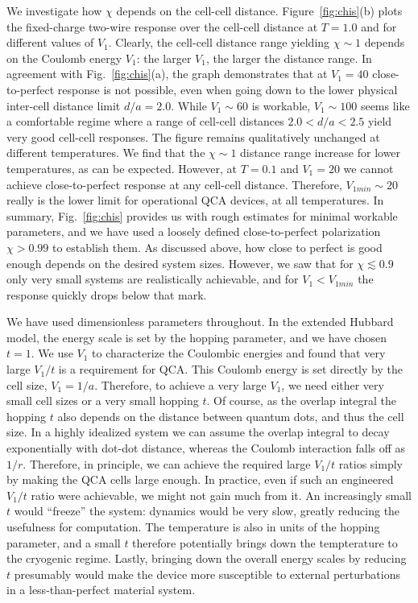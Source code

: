 We investigate how $\chi$ depends on the cell-cell distance.
Figure~\ref{fig:chis}(b) plots the fixed-charge two-wire response over the
cell-cell distance at $T = 1.0$ and for different values of $V_1$. Clearly, the
cell-cell distance range yielding $\chi \sim 1$ depends on the Coulomb energy
$V_1$: the larger $V_1$, the larger the distance range. In agreement with
Fig.~\ref{fig:chis}(a), the graph demonstrates that at $V_1 = 40$
close-to-perfect response is not possible, even when going down to the lower
physical inter-cell distance limit $d/a = 2.0$. While $V_1 \sim 60$ is workable,
$V_1 \sim 100$ seems like a comfortable regime where a range of cell-cell
distances $2.0 < d/a <2.5$ yield very good cell-cell responses. The figure
remains qualitatively unchanged at different temperatures. We find that the
$\chi \sim 1$ distance range increase for lower temperatures, as can be
expected. However, at $T = 0.1$ and $V_1 = 20$ we cannot achieve
close-to-perfect response at any cell-cell distance.  Therefore, $V_{1min} \sim
20$ really is the lower limit for operational QCA devices, at all temperatures.
In summary, Fig.~\ref{fig:chis} provides us with rough estimates for minimal
workable parameters, and we have used a loosely defined close-to-perfect
polarization $\chi > 0.99$ to establish them. As discussed above, how close to
perfect is good enough depends on the desired system sizes. However, we saw that
for $\chi \lesssim 0.9$ only very small systems are realistically achievable,
and for $V_1 < V_{1min}$ the response quickly drops below that mark.

We have used dimensionless parameters throughout. In the extended Hubbard model,
the energy scale is set by the hopping parameter, and we have chosen $t = 1$. We
use $V_1$ to characterize the Coulombic energies and found that very large
$V_1/t$ is a requirement for QCA. This Coulomb energy is set directly
by the cell size, $V_1 = 1/a$. Therefore, to achieve a very large
$V_1$, we need either very small cell sizes or a very small hopping $t$. Of
course, as the overlap integral the hopping $t$ also depends on the distance
between quantum dots, and thus the cell size. In a highly idealized system we
can assume the overlap integral to decay exponentially with dot-dot distance,
whereas the Coulomb interaction falls off as $1/r$. Therefore, in
principle, we can achieve the required large $V_1/t$ ratios simply by
making the QCA cells large enough. In practice, even if such an engineered
$V_1/t$ ratio were achievable, we might not gain much from it. An increasingly
small $t$ would ``freeze'' the system: dynamics would be very slow, greatly
reducing the usefulness for computation. The temperature is also in units of the
hopping parameter, and a small $t$ therefore potentially brings down the
tempterature to the cryogenic regime. Lastly, bringing down the overall energy
scales by reducing $t$ presumably would make the device more susceptible to
external perturbations in a less-than-perfect material system.

